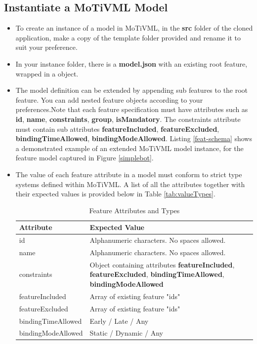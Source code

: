 \documentclass{article}
\begin{document}
\subsection{Instantiate a MoTiVML Model}
\begin{itemize}
	\item To create an instance of a model in MoTiVML, in the \textbf{src} folder of the cloned application, make a copy of the template folder provided and rename it to suit your preference.
	
	\item In your instance folder, there is a \textbf{model.json} with an existing root feature, wrapped in a object.
	
	\item The model definition can be extended by appending sub features to the root feature. You can add nested feature objects according to your preferences.Note that each feature specification must have attributes such as \textbf{id}, \textbf{name}, \textbf{constraints}, \textbf{group}, \textbf{isMandatory}. The constraints attribute must contain sub attributes \textbf{featureIncluded}, \textbf{featureExcluded}, \textbf{bindingTimeAllowed}, \textbf{bindingModeAllowed}. Listing \ref{feat-schema} shows a demonstrated example of an extended MoTiVML model instance, for the feature model captured in Figure \ref{simplebot}.
	
	\item The value of each feature attribute in a model must conform to strict type systems defined within MoTiVML. A list of all the attributes together with their expected values is provided below in Table \ref{tab:valueTypes}.
	
	\begin{table}[H]
		\caption{Feature Attributes and Types}
			\begin{tabular}{|l|p{10cm}|}
				\hline
				Attribute & Expected Value \\\hline
				id & Alphanumeric characters. No spaces allowed.   \\ \hline
				name & Alphanumeric characters. No spaces allowed.   \\ \hline
				constraints & Object containing attributes \textbf{featureIncluded}, \textbf{featureExcluded}, \textbf{bindingTimeAllowed}, \textbf{bindingModeAllowed}  \\ \hline
				featureIncluded & Array of existing feature "ids" \\ \hline
				
				featureExcluded & Array of existing feature "ids" \\ \hline
				bindingTimeAllowed & Early / Late / Any \\ \hline
				bindingModeAllowed & Static / Dynamic / Any \\ \hline
				

\end{tabular}
\end{table}
\end{itemize}
\end{document}
